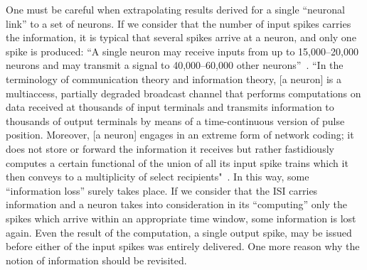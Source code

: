One must be careful when extrapolating results derived for a single “neuronal link” to a set of neurons. If we consider that the number of input spikes carries the information, it is typical that several spikes arrive at a neuron, and only one spike is produced: “A single neuron may receive inputs from up to 15,000–20,000 neurons and may transmit a signal to 40,000–60,000 other neurons”~\cite{SynapticOrganizationGordon:2004}. “In the terminology of communication theory and information theory, [a neuron] is a multiaccess, partially degraded broadcast channel that performs computations on data received at thousands of input terminals and transmits information to thousands of output terminals by means of a time-continuous version of pulse position. Moreover, [a neuron] engages in an extreme form of network coding; it does not store or forward the information it receives but rather fastidiously computes a certain functional of the union of all its input spike trains which it then conveys to a multiplicity of select recipients"~\cite{EnergyEfficientNeuralComputing:2010}. In this way, some “information loss” surely takes place. If we consider that the 
ISI
 carries information and a neuron takes into consideration in its “computing” only the spikes which arrive within an appropriate time window, some information is lost again. Even the result of the computation, a single output spike, may be issued before either of the input spikes was entirely delivered. One more reason why the notion of information should be revisited.
 
%
% 
